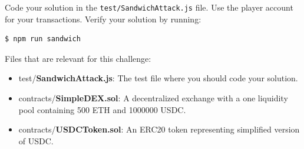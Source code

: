 \documentclass[12pt]{article}
\begin{document}
\noindent
Code your solution in the \texttt{test/SandwichAttack.js} file. Use the player account for your transactions. Verify your solution by running:

\begin{verbatim}
$ npm run sandwich
\end{verbatim}

\noindent
Files that are relevant for this challenge:
\begin{itemize}
\item test/\textbf{SandwichAttack.js}: The test file where you should code your solution.
\item contracts/\textbf{SimpleDEX.sol}: A decentralized exchange with a one liquidity pool containing 500 ETH and 1000000 USDC.
\item contracts/\textbf{USDCToken.sol}: An ERC20 token representing simplified version of USDC.
\end{itemize}
\end{document}
